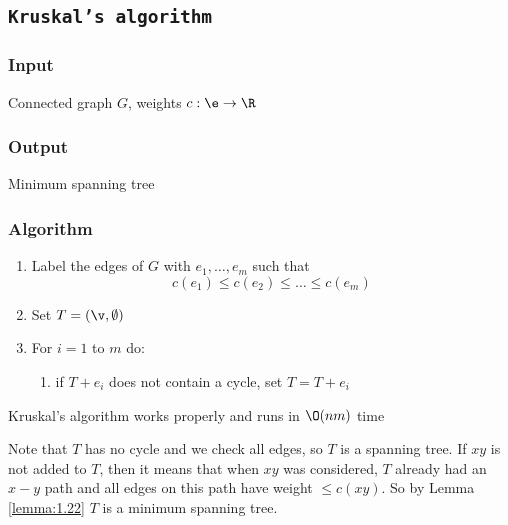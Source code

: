 \subsection{\texttt{Kruskal's algorithm}}
\subsubsection{Input}
Connected graph $G$, weights $c: \e \rightarrow \R$
\subsubsection{Output}
Minimum spanning tree
\subsubsection{Algorithm}
\begin{enumerate}
    \item Label the edges of $G$ with $e_1, \dots, e_m$ such that
    \begin{equation*}
        c(e_1) \leq c(e_2) \leq \dots \leq c(e_m)
    \end{equation*}
    \item Set $T = (\v, \emptyset)$
    \item For $i = 1$ to $m$ do:
    \begin{enumerate}
        \item if $T + e_i$ does not contain a cycle, set $T = T + e_i$
    \end{enumerate}
\end{enumerate}
\begin{customtheorem}{1.23}
    \label{theorem:1.23}
    Kruskal's algorithm works properly and runs in $\O(nm)$ time
\end{customtheorem}
\begin{prf}
    Note that $T$ has no cycle and we check all edges, so $T$ is a spanning tree. If $xy$ is not added to $T$, then it means that when $xy$ was considered, $T$ already had an $x - y$ path and all edges on this path have weight $\leq c(xy)$. So by Lemma \ref{lemma:1.22} $T$ is a minimum spanning tree.
\end{prf}

